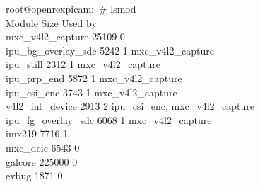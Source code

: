 {\begin{tcolorbox}
    root@openrexpicam:~\# lsmod \\
    Module                      \hspace{2.5cm}Size        \hspace{2cm}Used by\\
    mxc\_v4l2\_capture          \hspace{0.8cm}25109       \hspace{1.75cm}0 \\
    ipu\_bg\_overlay\_sdc       \hspace{0.5cm}5242        \hspace{1.9cm}1 mxc\_v4l2\_capture\\
    ipu\_still                  \hspace{2.5cm}2312        \hspace{1.95cm}1 mxc\_v4l2\_capture\\
    ipu\_prp\_end               \hspace{1.65cm}5872       \hspace{1.95cm}1 mxc\_v4l2\_capture\\
    ipu\_csi\_enc               \hspace{1.9cm}3743        \hspace{1.95cm}1 mxc\_v4l2\_capture\\
    v4l2\_int\_device           \hspace{1.23cm}2913       \hspace{1.95cm}2 ipu\_csi\_enc, mxc\_v4l2\_capture\\
    ipu\_fg\_overlay\_sdc       \hspace{0.55cm}6068       \hspace{1.95cm}1 mxc\_v4l2\_capture\\
    imx219                      \hspace{2.7cm}7716        \hspace{1.95cm}1 \\
    mxc\_dcic                   \hspace{2.3cm}6543        \hspace{2cm}0\\
    galcore                     \hspace{2.65cm}225000     \hspace{1.65cm}0\\
    evbug                       \hspace{2.8cm}1871        \hspace{2.05cm}0\\
\end{tcolorbox}

}
